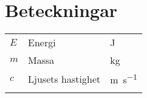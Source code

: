 \section*{Beteckningar}
%
\vspace{-5mm}
\begin{longtable*}[l]{@{} l l l @{}}
\toprule\endfirsthead
{} &  &  \\
\midrule
    $E$ & Energi & \si{\J} \\
    $m$ & Massa & \si{\kg} \\
    $c$ & Ljusets hastighet & \si{\m\per\s} \\
\bottomrule \\
\end{longtable*}